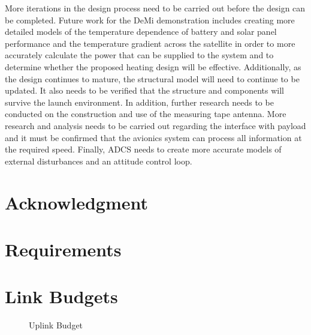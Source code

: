 \documentclass[12pt]{article}
\begin{document}
More iterations in the design process need to be carried out before the design can be completed.  Future work for the DeMi demonstration includes creating more detailed models of the temperature dependence of battery and solar panel performance and the temperature gradient across the satellite in order to more accurately calculate the power that can be supplied to the system and to determine whether the proposed heating design will be effective.  Additionally, as the design continues to mature, the structural model will need to continue to be updated.  It also needs to be verified that the structure and components will survive the launch environment. In addition, further research needs to be conducted on the construction and use of the measuring tape antenna.  More research and analysis needs to be carried out regarding the interface with payload and it must be confirmed that the avionics system can process all information at the required speed.  Finally, ADCS needs to create more accurate models of external disturbances and an attitude control loop.



\section{Acknowledgment}
	
	

\newpage
\appendix
\section{Requirements} \label{app:requirements}




\newpage
\section{Link Budgets} \label{app:link_budgets}

\begin{figure}[ht]
\centering 
\caption{Uplink Budget}
\end{figure}

\newpage
\noindent
\newline
\end{document}
